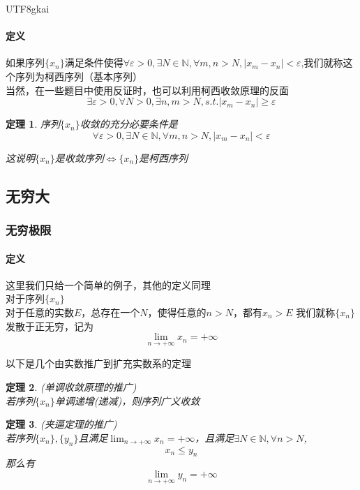 \documentclass{article}
\newtheorem{theorem}{定理}[subsection]
\begin{document}
\begin{CJK}{UTF8}{gkai}
\paragraph{定义\\}
如果序列$\{x_n\}$满足条件使得$\forall \varepsilon>0,\exists N\in \mathbb{N},\forall m,n>N,|x_m-x_n|<\varepsilon$,我们就称这个序列为柯西序列（基本序列）\\

当然，在一些题目中使用反证时，也可以利用柯西收敛原理的反面
\[\exists \varepsilon>0,\forall N>0,\exists n,m>N,s.t. |x_m-x_n|\geq \varepsilon\]
\begin{theorem}
序列$\{x_n\}$收敛的充分必要条件是
\[\forall \varepsilon>0,\exists N\in \mathbb{N},\forall m,n>N,|x_m-x_n|<\varepsilon\]

这说明$\{x_n\}$是收敛序列$\Leftrightarrow\{x_n\}$是柯西序列\\
\end{theorem}
\subsection{无穷大}

\subsubsection{无穷极限}
\paragraph{定义\\}
这里我们只给一个简单的例子，其他的定义同理\\

对于序列$\{x_n\}$\\
对于任意的实数$E$，总存在一个$N$，使得任意的$n>N$，都有$x_n > E$
我们就称$\{x_n\}$发散于正无穷，记为
\[\lim_{n\to +\infty}x_n=+\infty\]

以下是几个由实数推广到扩充实数系的定理\\
\begin{theorem}(单调收敛原理的推广)\\

若序列$\{x_n\}$单调递增(递减)，则序列广义收敛\\
\end{theorem}
\begin{theorem}(夹逼定理的推广)\\

若序列$\{x_n\},\{y_n\}$且满足$\lim_{n\to +\infty}x_n=+\infty$，且满足$\exists N\in \mathbb{N},\forall n > N$,
\[x_n\leq y_n\]
那么有
\[\lim_{n\to +\infty}y_n=+\infty\]


\end{theorem}
\end{CJK}
\end{document}
